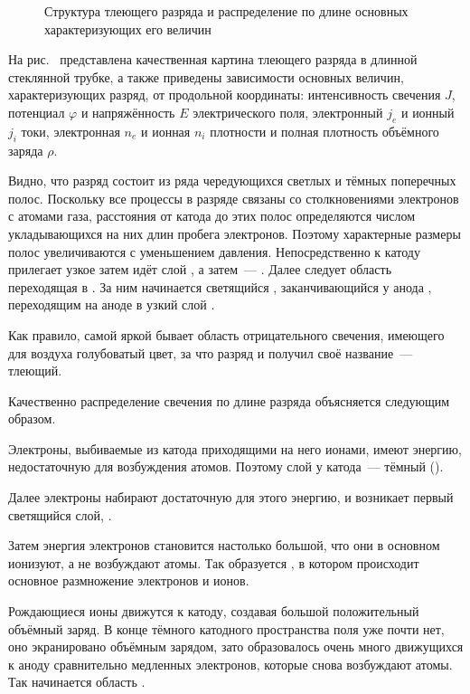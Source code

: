 \begin{figure}[h!]
	\centering
	\caption{Структура тлеющего разряда и распределение по длине основных характеризующих его величин}
\end{figure}

На рис.~ представлена качественная картина тлеющего
разряда в длинной стеклянной трубке, а также приведены зависимости
основных величин, характеризующих разряд, от продольной координаты:
интенсивность свечения $J$, потенциал $\varphi$ и напряжённость $E$ электрического поля,
электронный $j_e$ и ионный $j_i$ токи,
электронная $n_e$ и ионная $n_i$ плотности и полная плотность объёмного заряда $\rho$.

Видно, что разряд состоит из ряда чередующихся светлых и тёмных поперечных
полос. Поскольку все процессы в разряде
связаны со столкновениями электронов с атомами газа, расстояния от катода до
этих полос определяются числом
укладывающихся на них длин пробега электронов. Поэтому характерные размеры полос
увеличиваются с уменьшением давления.
Непосредственно к катоду прилегает узкое 
затем идёт слой , а
затем~--- . Далее следует область
 переходящая в
. За ним начинается светящийся
, заканчивающийся у анода
, переходящим на аноде в узкий слой
.

Как правило, самой яркой бывает область отрицательного свечения, имеющего для
воздуха голубоватый цвет, за что разряд и
получил своё название~--- тлеющий.

Качественно распределение свечения по длине разряда объясняется следующим
образом.

Электроны, выбиваемые из катода приходящими на него ионами, имеют энергию,
недостаточную для возбуждения атомов. Поэтому слой у катода~--- тёмный
().

Далее электроны набирают достаточную
для этого энергию, и возникает первый светящийся слой,
.

Затем энергия электронов становится настолько
большой, что они в основном ионизуют, а не возбуждают атомы. Так образуется
, в котором происходит
основное размножение электронов и ионов.

Рождающиеся ионы движутся к катоду,
создавая большой положительный объёмный заряд. В конце тёмного
катодного пространства поля уже почти нет, оно экранировано объёмным зарядом,
зато образовалось очень много движущихся к аноду сравнительно медленных
электронов, которые снова возбуждают атомы. Так
начинается область .


